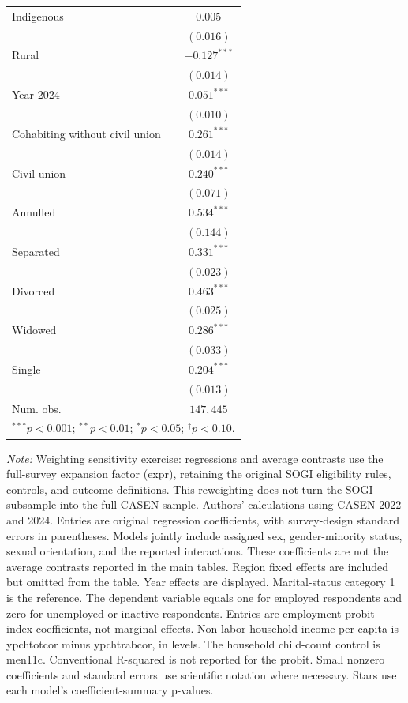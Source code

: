 \begin{table}[htpb]
\begin{tabular}{l c}
Indigenous & $0.005$ \\
 & $(0.016)$ \\
Rural & $-0.127^{***}$ \\
 & $(0.014)$ \\
Year 2024 & $0.051^{***}$ \\
 & $(0.010)$ \\
Cohabiting without civil union & $0.261^{***}$ \\
 & $(0.014)$ \\
Civil union & $0.240^{***}$ \\
 & $(0.071)$ \\
Annulled & $0.534^{***}$ \\
 & $(0.144)$ \\
Separated & $0.331^{***}$ \\
 & $(0.023)$ \\
Divorced & $0.463^{***}$ \\
 & $(0.025)$ \\
Widowed & $0.286^{***}$ \\
 & $(0.033)$ \\
Single & $0.204^{***}$ \\
 & $(0.013)$ \\
\hline
Num. obs. & $147,445$ \\
\hline
\multicolumn{2}{l}{\scriptsize $^{***}p<0.001$; $^{**}p<0.01$; $^{*}p<0.05$; $^{\dagger}p<0.10$.} \\
\end{tabular}%
\par\smallskip
\begin{minipage}{\textwidth}\footnotesize\raggedright
\textit{Note:} Weighting sensitivity exercise: regressions and average contrasts use the full-survey expansion factor (expr), retaining the original SOGI eligibility rules, controls, and outcome definitions. This reweighting does not turn the SOGI subsample into the full CASEN sample. Authors' calculations using CASEN 2022 and 2024. Entries are original regression coefficients, with survey-design standard errors in parentheses. Models jointly include assigned sex, gender-minority status, sexual orientation, and the reported interactions. These coefficients are not the average contrasts reported in the main tables. Region fixed effects are included but omitted from the table. Year effects are displayed. Marital-status category 1 is the reference. The dependent variable equals one for employed respondents and zero for unemployed or inactive respondents. Entries are employment-probit index coefficients, not marginal effects. Non-labor household income per capita is ypchtotcor minus ypchtrabcor, in levels. The household child-count control is men11c. Conventional R-squared is not reported for the probit. Small nonzero coefficients and standard errors use scientific notation where necessary. Stars use each model's coefficient-summary p-values.
\end{minipage}
\end{table}
